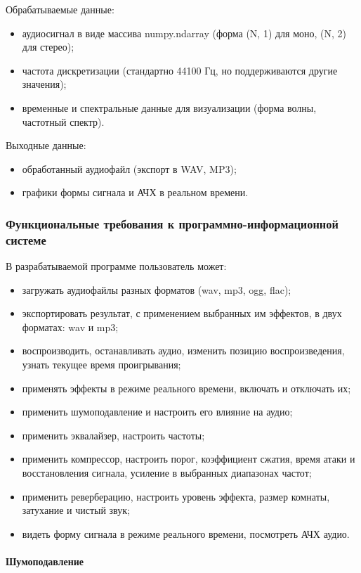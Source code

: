 Обрабатываемые данные:
\begin{itemize}
	\item аудиосигнал в виде массива numpy.ndarray (форма (N, 1) для моно, (N, 2) для стерео); 
	\item частота дискретизации (стандартно 44100 Гц, но поддерживаются другие значения);
	\item временные и спектральные данные для визуализации (форма волны, частотный спектр).
\end{itemize}

Выходные данные:
\begin{itemize}
	\item обработанный аудиофайл (экспорт в WAV, MP3);
	\item графики формы сигнала и АЧХ в реальном времени.
\end{itemize}

\subsubsection{Функциональные требования к программно-информационной системе}

В разрабатываемой программе пользователь может:
\begin{itemize}
	\item загружать аудиофайлы разных форматов (wav, mp3, ogg, flac);
	\item экспортировать результат, с применением выбранных им эффектов, в двух форматах: wav и mp3;
	\item воспроизводить, останавливать аудио, изменить позицию воспроизведения, узнать текущее время проигрывания;
	\item применять эффекты в режиме реального времени, включать и отключать их;
	\item применить шумоподавление и настроить его влияние на аудио;
	\item применить эквалайзер, настроить частоты;
	\item применить компрессор, настроить порог, коэффициент сжатия, время атаки и восстановления сигнала, усиление в выбранных диапазонах частот;
	\item применить реверберацию, настроить уровень эффекта, размер комнаты, затухание и чистый звук;
	\item видеть форму сигнала в режиме реального времени, посмотреть АЧХ аудио.
\end{itemize}

\paragraph{Шумоподавление}


